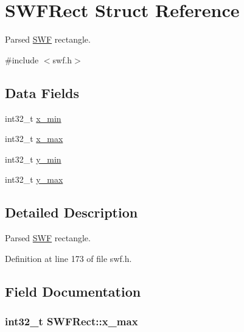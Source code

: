 \hypertarget{struct_s_w_f_rect}{}\section{S\+W\+F\+Rect Struct Reference}
\label{struct_s_w_f_rect}


Parsed \hyperlink{struct_s_w_f}{S\+W\+F} rectangle.  




{\ttfamily \#include $<$swf.\+h$>$}

\subsection*{Data Fields}
\begin{DoxyCompactItemize}
\item 
int32\+\_\+t \hyperlink{struct_s_w_f_rect_a8a6e16836789a2ad0f04a47571521da5}{x\+\_\+min}
\item 
int32\+\_\+t \hyperlink{struct_s_w_f_rect_ac7003c5b218caff09e7720268dc9caf1}{x\+\_\+max}
\item 
int32\+\_\+t \hyperlink{struct_s_w_f_rect_a02bf454cdaad92d3e78497f85dccda5d}{y\+\_\+min}
\item 
int32\+\_\+t \hyperlink{struct_s_w_f_rect_ad4030c2fb8cf190685abbb1db5b60d9c}{y\+\_\+max}
\end{DoxyCompactItemize}


\subsection{Detailed Description}
Parsed \hyperlink{struct_s_w_f}{S\+W\+F} rectangle. 

Definition at line 173 of file swf.\+h.



\subsection{Field Documentation}
\hypertarget{struct_s_w_f_rect_ac7003c5b218caff09e7720268dc9caf1}{}
\subsubsection[{x\+\_\+max}]{\setlength{\rightskip}{0pt plus 5cm}int32\+\_\+t S\+W\+F\+Rect\+::x\+\_\+max}\label{struct_s_w_f_rect_ac7003c5b218caff09e7720268dc9caf1}



